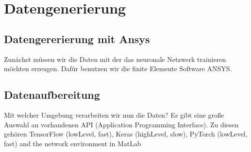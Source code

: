 \chapter{Datengenerierung}

\section{Datengererierung mit Ansys}

Zunächst müssen wir die Daten mit der das neuronale Netzwerk trainieren möchten erzeugen. Dafür benutzen wir die finite Elemente Software ANSYS.

\section{Datenaufbereitung}

Mit welcher Umgebung verarbeiten wir nun die Daten? Es gibt eine große Auswahl an vorhandenen API (Application Programming Interface). Zu diesen gehören TensorFlow (lowLevel, fast), Keras (highLevel, slow), PyTorch (lowLevel, fast) and the network environment in MatLab